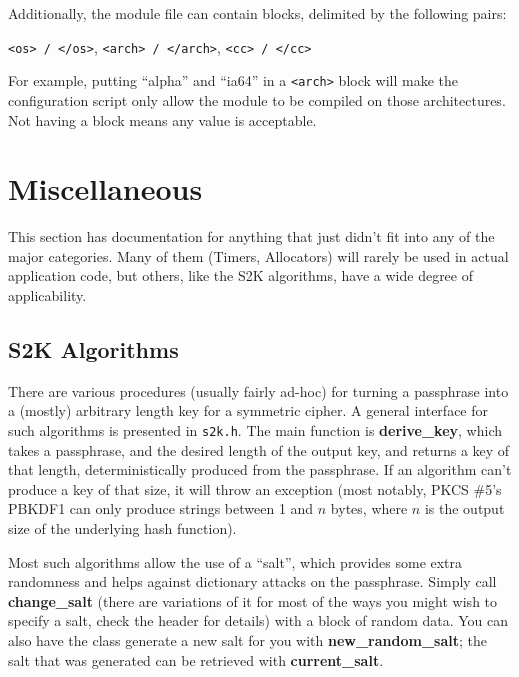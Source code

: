 \documentclass{article}
\newcommand{\filename}[1]{\texttt{#1}}
\newcommand{\function}[1]{\textbf{#1}}
\begin{document}

Additionally, the module file can contain blocks, delimited by the
following pairs:

\texttt{<os> / </os>}, \texttt{<arch> / </arch>}, \texttt{<cc> / </cc>}

\noindent
For example, putting ``alpha'' and ``ia64'' in a \texttt{<arch>} block will
make the configuration script only allow the module to be compiled on those
architectures. Not having a block means any value is acceptable.

\pagebreak
\section{Miscellaneous}

This section has documentation for anything that just didn't fit into any of
the major categories. Many of them (Timers, Allocators) will rarely be used in
actual application code, but others, like the S2K algorithms, have a wide
degree of applicability.

\subsection{S2K Algorithms}

There are various procedures (usually fairly ad-hoc) for turning a passphrase
into a (mostly) arbitrary length key for a symmetric cipher. A general
interface for such algorithms is presented in \filename{s2k.h}. The main
function is \function{derive\_key}, which takes a passphrase, and the desired
length of the output key, and returns a key of that length, deterministically
produced from the passphrase. If an algorithm can't produce a key of that size,
it will throw an exception (most notably, PKCS \#5's PBKDF1 can only produce
strings between 1 and $n$ bytes, where $n$ is the output size of the underlying
hash function).

Most such algorithms allow the use of a ``salt'', which provides some extra
randomness and helps against dictionary attacks on the passphrase. Simply call
\function{change\_salt} (there are variations of it for most of the ways you
might wish to specify a salt, check the header for details) with a block of
random data. You can also have the class generate a new salt for you with
\function{new\_random\_salt}; the salt that was generated can be retrieved with
\function{current\_salt}.
\end{document}
